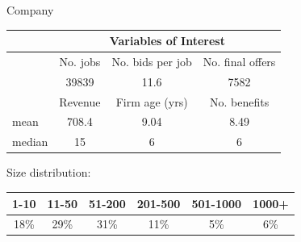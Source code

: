 \begin{frame}{Company}
    
    \begin{table}[h!]
        \footnotesize
        \begin{center}
            \label{tab:firm}
            \begin{tabular}{lccc}
                & \multicolumn{3}{c}{Variables of Interest} \\
               \hline
                & No. jobs & No. bids per job & No. final offers \\
                & 39839 & 11.6 & 7582 \\
                \hline
                & Revenue & Firm age (yrs) & No. benefits \\
                mean & 708.4 & 9.04 & 8.49 \\
                median & 15 & 6 & 6 \\
                \hline 
                
            \end{tabular}
        \end{center}
    \end{table}

    \vspace*{10pt}
    Size distribution:
    \begin{table}[h!]
        \footnotesize
        \begin{center}
            \begin{tabular}{cccccc}
                1-10 & 11-50 & 51-200 & 201-500 & 501-1000 & 1000+ \\
                \hline 
               18\% & 29\% & 31\% & 11\% & 5\% & 6\%
            \end{tabular}
        \end{center}
    \end{table}
\end{frame}

